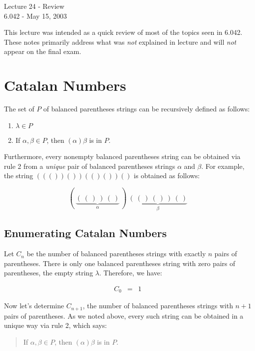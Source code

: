 \documentclass[twoside,12pt]{article}
\newcommand{\beqn}{\begin{eqnarray*}}
\newcommand{\eeqn}{\end{eqnarray*}}
\begin{document}
\begin{center}
{\Large Lecture 24 - Review} \\
6.042 - May 15, 2003 \\
\bigskip
\end{center}

This lecture was intended as a quick review of most of the topics seen
in 6.042.  These notes primarily address what was {\em not} explained
in lecture and will {\em not} appear on the final exam.

\section{Catalan Numbers}

The set of $P$ of balanced parentheses strings can be recursively
defined as follows:

\begin{enumerate}

\item $\lambda \in P$

\item If $\alpha, \beta \in P$, then $(\alpha)\beta$ is in $P$.

\end{enumerate}

\noindent Furthermore, every nonempty balanced parentheses string can
be obtained via rule 2 from a {\em unique} pair of balanced
parentheses strings $\alpha$ and $\beta$.  For example, the string
$((())())(()())()$ is obtained as follows:

\[
(\ \underbrace{(\ (\ )\ )\ (\ )}_{\alpha}\ )\ \underbrace{(\ (\ )\ (\ )\ )\ (\ )}_{\beta}
\]

\subsection{Enumerating Catalan Numbers}

Let $C_n$ be the number of balanced parentheses strings with exactly
$n$ pairs of parentheses.  There is only one balanced parentheses
string with zero pairs of parentheses, the empty string $\lambda$.
Therefore, we have:

\beqn
C_0 & = & 1
\eeqn

Now let's determine $C_{n+1}$, the number of balanced parentheses
strings with $n+1$ pairs of parentheses.  As we noted above, every
such string can be obtained in a unique way via rule 2, which says:

\begin{quotation}
If $\alpha, \beta \in P$, then $(\alpha)\beta$ is in $P$.
\end{quotation}
\end{document}
